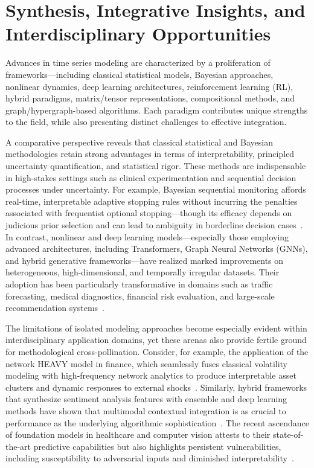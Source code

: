 \documentclass[11pt]{article}
\begin{document}
\section{Synthesis, Integrative Insights, and Interdisciplinary Opportunities}

Advances in time series modeling are characterized by a proliferation of frameworks—including classical statistical models, Bayesian approaches, nonlinear dynamics, deep learning architectures, reinforcement learning (RL), hybrid paradigms, matrix/tensor representations, compositional methods, and graph/hypergraph-based algorithms. Each paradigm contributes unique strengths to the field, while also presenting distinct challenges to effective integration.

A comparative perspective reveals that classical statistical and Bayesian methodologies retain strong advantages in terms of interpretability, principled uncertainty quantification, and statistical rigor. These methods are indispensable in high-stakes settings such as clinical experimentation and sequential decision processes under uncertainty. For example, Bayesian sequential monitoring affords real-time, interpretable adaptive stopping rules without incurring the penalties associated with frequentist optional stopping---though its efficacy depends on judicious prior selection and can lead to ambiguity in borderline decision cases~\cite{ref87}. In contrast, nonlinear and deep learning models—especially those employing advanced architectures, including Transformers, Graph Neural Networks (GNNs), and hybrid generative frameworks—have realized marked improvements on heterogeneous, high-dimensional, and temporally irregular datasets. Their adoption has been particularly transformative in domains such as traffic forecasting, medical diagnostics, financial risk evaluation, and large-scale recommendation systems~\cite{ref2,ref7,ref10,ref15,ref20,ref31,ref86}.

The limitations of isolated modeling approaches become especially evident within interdisciplinary application domains, yet these arenas also provide fertile ground for methodological cross-pollination. Consider, for example, the application of the network HEAVY model in finance, which seamlessly fuses classical volatility modeling with high-frequency network analytics to produce interpretable asset clusters and dynamic responses to external shocks~\cite{ref2}. Similarly, hybrid frameworks that synthesize sentiment analysis features with ensemble and deep learning methods have shown that multimodal contextual integration is as crucial to performance as the underlying algorithmic sophistication~\cite{ref8,ref14}. The recent ascendance of foundation models in healthcare and computer vision attests to their state-of-the-art predictive capabilities but also highlights persistent vulnerabilities, including susceptibility to adversarial inputs and diminished interpretability~\cite{ref61,ref65,ref86,ref83}.
\end{document}
